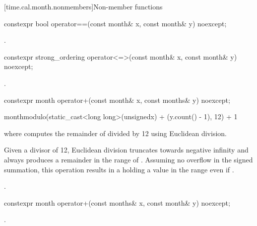 [time.cal.month.nonmembers]{Non-member functions}

%
\begin{itemdecl}
constexpr bool operator==(const month& x, const month& y) noexcept;
\end{itemdecl}

\begin{itemdescr}
\pnum
\returns
{}.
\end{itemdescr}

%
\begin{itemdecl}
constexpr strong_ordering operator<=>(const month& x, const month& y) noexcept;
\end{itemdecl}

\begin{itemdescr}
\pnum
\returns
{}.
\end{itemdescr}

%
\begin{itemdecl}
constexpr month operator+(const month& x, const months& y) noexcept;
\end{itemdecl}

\begin{itemdescr}
\pnum
\returns
\begin{codeblock}
month{modulo(static_cast<long long>(unsigned{x}) + (y.count() - 1), 12) + 1}
\end{codeblock}
where  computes the remainder of  divided by 12 using Euclidean division.
\begin{note}
Given a divisor of 12, Euclidean division truncates towards negative infinity and
always produces a remainder in the range of .
Assuming no overflow in the signed summation,
this operation results in a  holding a value in the range  even if .
\end{note}
\begin{example}
.
\end{example}
\end{itemdescr}

%
\begin{itemdecl}
constexpr month operator+(const months& x, const month& y) noexcept;
\end{itemdecl}

\begin{itemdescr}
\pnum
\returns
{}.
\end{itemdescr}

